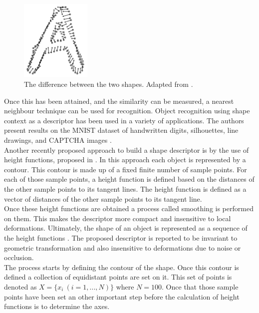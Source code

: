\begin{figure}[h]
        \centering
        \includegraphics[width=0.3\textwidth]{figures/LitreatureReview/contextResult.png}
        \caption[Estimated transformation alignment between two shapes in shape context]{The difference between the two shapes. Adapted from \cite{context}.}
        \label{fig:contextResult}
\end{figure}

Once this has been attained, and the similarity can be measured, a nearest neighbour technique can be used for recognition. Object recognition using shape context as a descriptor has been used in a variety of applications. The authors present results on the MNIST dataset of handwritten digits, silhouettes, line drawings, and CAPTCHA images \cite{context}.\\

Another recently proposed approach to build a shape descriptor is by the use of height functions, proposed in \cite{wang}. In this approach each object is represented by a contour. This contour is made up of a fixed finite number of sample points. For each of those sample points, a height function is defined based on the distances of the other sample points to its tangent lines. The height function is defined as a vector of distances of the other sample points to its tangent line. \\

Once these height functions are obtained a process called smoothing is performed on them. This makes the descriptor more compact and insensitive to local deformations. Ultimately, the shape of an object is represented as a sequence of the height functions \cite{wang}. The proposed descriptor is reported to be invariant to geometric transformation and also insensitive to deformations due to noise or occlusion. \\

The process starts by defining the contour of the shape. Once this contour is defined a collection of equidistant points are set on it. This set of points is denoted as $X = \{x_{i}\ (i=1,...,N)\}$ where $N=100$. Once that those sample points have been set an other important step before the calculation of height functions is to determine the axes.\\ 

